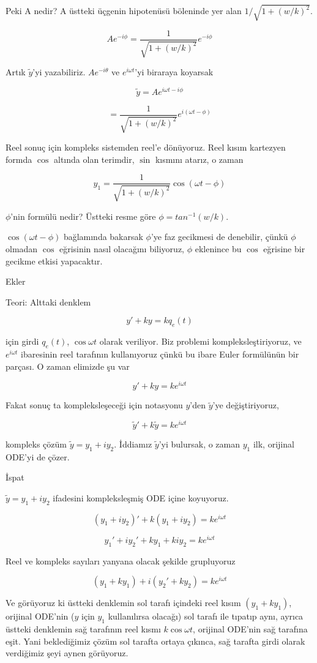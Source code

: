 \documentclass[12pt,fleqn]{article}\usepackage{../../common}
\begin{document}
Peki A nedir? A üstteki üçgenin hipotenüsü böleninde yer alan $1 /
\sqrt{1+(w/k)^2}$. 

$$ A e^{-i\phi} = \frac{1}{\sqrt{1+(w/k)^2}} e^{-i\phi}$$

Artık $\tilde{y}$'yi yazabiliriz. $Ae^{-i\theta}$ ve $e^{i\omega t}$'yi 
biraraya koyarsak

$$ \tilde{y} = A e^{i\omega t - i\phi} $$

$$ = \frac{1}{\sqrt{1+(w/k)^2}} e^{i(\omega t - \phi)} $$

Reel sonuç için kompleks sistemden reel'e dönüyoruz. Reel kısım kartezyen
formda $\cos$ altında olan terimdir, $\sin$ kısmını atarız, o zaman

$$ y_1 = \frac{1}{\sqrt{1+(w/k)^2}} \cos(\omega t - \phi) $$

$\phi$'nin formülü nedir? Üstteki resme göre $\phi = tan^{-1}(w/k)$.

$\cos(\omega t - \phi)$ bağlamında bakarsak $\phi$'ye faz gecikmesi de
denebilir, çünkü $\phi$ olmadan $\cos$ eğrisinin nasıl olacağını biliyoruz,
$\phi$ eklenince bu $\cos$ eğrisine bir gecikme etkisi yapacaktır.

Ekler

Teori: Alttaki denklem

$$y' + ky = kq_e(t)$$

için girdi $q_e(t)$, $\cos \omega t$ olarak veriliyor. Biz problemi
kompleksleştiriyoruz, ve $e^{i\omega t}$ ibaresinin reel tarafının
kullanıyoruz çünkü bu ibare Euler formülünün bir parçası. O zaman elimizde
şu var

$$y' + ky = k e^{i \omega t}$$

Fakat sonuç ta kompleksleşeceği için notasyonu $y$'den $\tilde{y}$'ye  değiştiriyoruz,

$$\tilde{y}' + k\tilde{y} = k e^{i \omega t}$$

kompleks çözüm $\tilde{y} = y_1 + iy_2$. İddiamız $\tilde{y}$'yi bulursak,
o zaman $y_1$ ilk, orijinal ODE'yi de çözer.

İspat

$\tilde{y} = y_1 + iy_2$ ifadesini kompleksleşmiş ODE içine koyuyoruz.

$$(y_1 + iy_2)' + k(y_1 + iy_2) = k e^{i\omega t}$$

$$y_1' + iy_2' + ky_1 + kiy_2 = ke^{i\omega t}$$

Reel ve kompleks sayıları yanyana olacak şekilde grupluyoruz

$$(y_1+ky_1) + i(y_2' + ky_2) = ke^{i\omega t}$$

Ve görüyoruz ki üstteki denklemin sol tarafı içindeki reel kısım
$(y_1+ky_1)$, orijinal ODE'nin ($y$ için $y_1$ kullanılırsa olacağı) sol
tarafı ile tıpatıp aynı, ayrıca üstteki denklemin sağ tarafının reel kısmı
$k \cos \omega t$, orijinal ODE'nin sağ tarafına eşit. Yani beklediğimiz
çözüm sol tarafta ortaya çıkınca, sağ tarafta girdi olarak verdiğimiz şeyi
aynen görüyoruz. 
\end{document}

